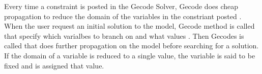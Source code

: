 Every time a constraint is posted in the Gecode Solver, Gecode does cheap propagation to reduce the domain 
of the variables in the constriant posted \cite[p. 19.]{MPG:M}. \\ 
When the user request an initial solution to the model, Gecode {} method is called that 
specify which varialbes to branch on and what values . Then Gecodes  is 
called that does further propagation on the model before searching for a solution. If the domain of a variable is 
reduced to a single value, the variable is said to be fixed and is assigned that value. 